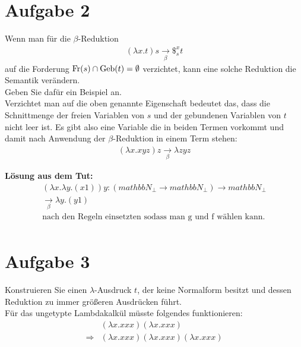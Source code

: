 \documentclass[ngerman,a4paper]{report}
\begin{document}
\section*{Aufgabe 2}
Wenn man für die $\beta$-Reduktion
\begin{align*}
(\lambda x.t) s \xrightarrow[\beta]{} \$_s^x t
\end{align*}
auf die Forderung $\text{\lstinline!Fr!}(s) \cap \text{\lstinline!Geb!}(t) = \emptyset$ verzichtet, kann eine solche Reduktion die Semantik verändern.\\
Geben Sie dafür ein Beispiel an.\\

Verzichtet man auf die oben genannte Eigenschaft bedeutet das, dass die Schnittmenge der freien Variablen von $s$ und der gebundenen Variablen von $t$ nicht leer ist. Es gibt also eine Variable die in beiden Termen vorkommt und damit nach Anwendung der $\beta$-Reduktion in einem Term stehen:
\begin{align*}
(\lambda x.xyz) z \xrightarrow[\beta]{} \lambda zyz
\end{align*}

\textbf{Lösung aus dem Tut:}
\begin{align*}
(\lambda x . \lambda y . (x1)) y : (mathbb{N}_\perp \rightarrow mathbb{N}_\perp) \rightarrow mathbb{N}_\perp\\
\xrightarrow[\beta]{} \lambda y. (y 1)\\
\text{nach den Regeln einsetzten sodass man g und f wählen kann.}\\
\end{align*}

\section*{Aufgabe 3}
Konstruieren Sie einen $\lambda$-Ausdruck $t$, der keine Normalform besitzt und dessen Reduktion zu immer größeren Ausdrücken führt.\\
%
Für das ungetypte Lambdakalkül müsste folgendes funktionieren:\\
\begin{align*}
	&    (\lambda x.xxx)(\lambda x.xxx)\\
	\Rightarrow&(\lambda x.xxx)(\lambda x.xxx)(\lambda x.xxx)\\
\end{align*}
\end{document}
